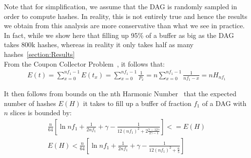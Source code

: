 \documentclass[runningheads]{llncs}
\newcommand{\trishita}[1]{{\color{magenta}\bfseries[Trishita: #1]}}
\begin{document}
Note that for simplification, we assume that the DAG is randomly sampled in order to compute hashes. In reality, this is not entirely true and hence the results we obtain from this analysis are more conservative than what we see in practice. In fact, while we show here that filling up 95\% of a buffer as big as the DAG takes 800k hashes, whereas in reality it only takes half as many hashes~\ref{section:Results} \\
From the Coupon Collector Problem~\cite{couponCollector}, it follows that:
\begin{gather}
E(t) = \sum_{x=0}^{nf_1-1}E(t_x) = \sum_{x=0}^{nf_1-1}\frac{1}{P_x} = n\sum_{x=0}^{nf_1-1}\frac{1}{nf_1-x} = nH_{nf_1}
\end{gather}

It then follows from bounds on the nth Harmonic Number~\cite{harmonicNumber} that the expected number of hashes $E(H)$ it takes to fill up a buffer of fraction $f_1$ of a DAG with $n$ slices is bounded by:
\begin{gather}
\frac{n}{64}[\ln{nf_1} + \frac{1}{2nf_1} + \gamma - \frac{1}{12({nf_1})^2+2\frac{7-12\gamma}{2\gamma - 1}}] <= E(H) \\ E(H)< \frac{n}{64}[\ln{nf_1} + \frac{1}{2nf_1} + \gamma - \frac{1}{12({nf_1})^2+\frac{6}{5}}] 
\end{gather}
\end{document}
